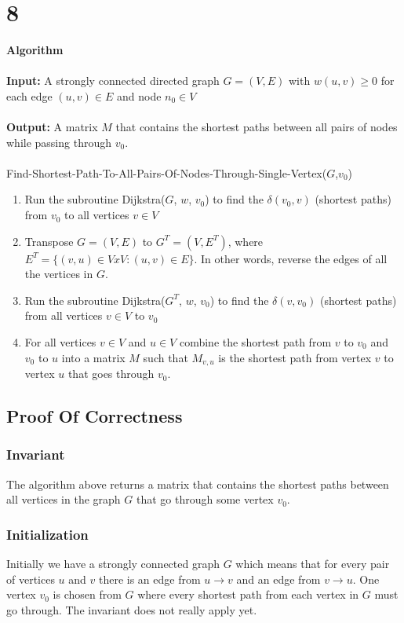 \documentclass[12pt]{article}
\begin{document}
\section*{8}
{\selectfont
\textbf{Algorithm}\\
\\
\textbf{Input:} A strongly connected directed graph $G=(V,E)$ with $w(u,v) \ge 0$ for each edge $(u,v) \in E$ and node $n_0 \in V$\\
\\
\textbf{Output:} A matrix $M$ that contains the shortest paths between all pairs of nodes while passing through $v_0$.\\
\\
Find-Shortest-Path-To-All-Pairs-Of-Nodes-Through-Single-Vertex($G$,$v_0$)
\begin{enumerate}
\item Run the subroutine Dijkstra($G$, $w$, $v_0$) to find the $\delta{(v_0,v)}$ (shortest paths) from $v_0$ to all vertices $v \in V$\\
\item Transpose $G=(V,E)$ to $G^T = (V,E^T)$, where $E^T = \{(v,u) \in VxV:(u,v)\in E \}$.  In other words, reverse the edges of all the vertices in $G$.
\item Run the subroutine Dijkstra($G^T$, $w$, $v_0$) to find the $\delta{(v, v_0)}$ (shortest paths) from all vertices $v \in V$ to $v_0$\\
\item For all vertices $v \in V$ and $u \in V$ combine the shortest path from $v$ to $v_0$ and $v_0$ to $u$ into a matrix $M$ such that $M_{v,u}$ is the shortest path from vertex $v$ to vertex $u$ that goes through $v_0$.\\ 
\end{enumerate}
}

\subsection*{Proof Of Correctness}
\subsubsection*{Invariant}
The algorithm above returns a matrix that contains the shortest paths between all vertices in the graph $G$ that go through some vertex $v_0$.\\
\subsubsection*{Initialization}
Initially we have a strongly connected graph $G$ which means that for every pair of vertices $u$ and $v$ there is an edge from $u \rightarrow v$ and an edge from $v \rightarrow u$.
One vertex $v_0$ is chosen from $G$ where every shortest path from each vertex in $G$ must go through.  The invariant does not really apply yet.
\end{document}
